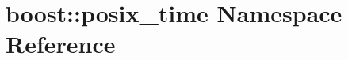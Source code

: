 \hypertarget{namespaceboost_1_1posix__time}{}\section{boost\+:\+:posix\+\_\+time Namespace Reference}
\label{namespaceboost_1_1posix__time}
